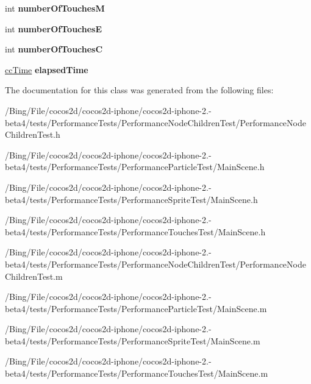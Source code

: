 \begin{DoxyCompactItemize}
\item 
\hypertarget{interface_main_scene_a209c6a5c1ea8688fbf030bf3020db10c}{int {\bfseries number\-Of\-Touches\-M}}\label{interface_main_scene_a209c6a5c1ea8688fbf030bf3020db10c}

\item 
\hypertarget{interface_main_scene_a8f1027377e6c844e9cd432edf52d5784}{int {\bfseries number\-Of\-Touches\-E}}\label{interface_main_scene_a8f1027377e6c844e9cd432edf52d5784}

\item 
\hypertarget{interface_main_scene_ad521bd98e63084e90bb1faff6ae836d1}{int {\bfseries number\-Of\-Touches\-C}}\label{interface_main_scene_ad521bd98e63084e90bb1faff6ae836d1}

\item 
\hypertarget{interface_main_scene_af0e56990b784974c37ce4304799d83db}{\hyperlink{cc_types_8h_ae6c674aac4bfb46a4e6cb1e89bb66b4f}{cc\-Time} {\bfseries elapsed\-Time}}\label{interface_main_scene_af0e56990b784974c37ce4304799d83db}

\end{DoxyCompactItemize}


The documentation for this class was generated from the following files\-:\begin{DoxyCompactItemize}
\item 
/\-Bing/\-File/cocos2d/cocos2d-\/iphone/cocos2d-\/iphone-\/2.-\/beta4/tests/\-Performance\-Tests/\-Performance\-Node\-Children\-Test/Performance\-Node\-Children\-Test.\-h\item 
/\-Bing/\-File/cocos2d/cocos2d-\/iphone/cocos2d-\/iphone-\/2.-\/beta4/tests/\-Performance\-Tests/\-Performance\-Particle\-Test/Main\-Scene.\-h\item 
/\-Bing/\-File/cocos2d/cocos2d-\/iphone/cocos2d-\/iphone-\/2.-\/beta4/tests/\-Performance\-Tests/\-Performance\-Sprite\-Test/Main\-Scene.\-h\item 
/\-Bing/\-File/cocos2d/cocos2d-\/iphone/cocos2d-\/iphone-\/2.-\/beta4/tests/\-Performance\-Tests/\-Performance\-Touches\-Test/Main\-Scene.\-h\item 
/\-Bing/\-File/cocos2d/cocos2d-\/iphone/cocos2d-\/iphone-\/2.-\/beta4/tests/\-Performance\-Tests/\-Performance\-Node\-Children\-Test/Performance\-Node\-Children\-Test.\-m\item 
/\-Bing/\-File/cocos2d/cocos2d-\/iphone/cocos2d-\/iphone-\/2.-\/beta4/tests/\-Performance\-Tests/\-Performance\-Particle\-Test/Main\-Scene.\-m\item 
/\-Bing/\-File/cocos2d/cocos2d-\/iphone/cocos2d-\/iphone-\/2.-\/beta4/tests/\-Performance\-Tests/\-Performance\-Sprite\-Test/Main\-Scene.\-m\item 
/\-Bing/\-File/cocos2d/cocos2d-\/iphone/cocos2d-\/iphone-\/2.-\/beta4/tests/\-Performance\-Tests/\-Performance\-Touches\-Test/Main\-Scene.\-m\end{DoxyCompactItemize}
